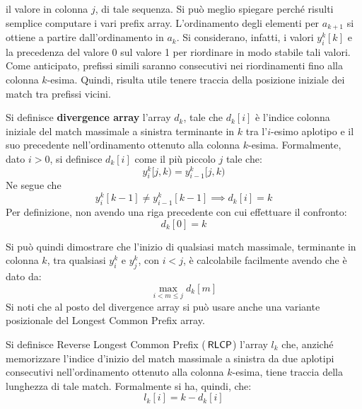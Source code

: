 il valore in colonna $j$, di tale
sequenza. Si può meglio spiegare perché risulti 
semplice computare i vari prefix array. L'ordinamento degli elementi per
$a_{k+1}$ si ottiene a partire 
dall'ordinamento in $a_k$. Si considerano, infatti, i valori $y_i^k[k]$ e la
precedenza del valore 0 sul valore 1 per riordinare in modo stabile tali
valori.\\ 
Come anticipato, prefissi simili saranno consecutivi nei riordinamenti fino alla
colonna $k$-esima. Quindi, risulta utile tenere traccia della posizione iniziale
dei match tra prefissi vicini. 
\begin{definizione}
  Si definisce \textbf{divergence array} l'array $d_k$, tale che $d_k[i]$ è
  l'indice colonna iniziale del match massimale a sinistra terminante in $k$ tra
  l'$i$-esimo aplotipo e il suo precedente nell'ordinamento ottenuto alla
  colonna $k$-esima. Formalmente, dato $i>0$, si definisce 
  $d_k[i]$ come il più piccolo $j$ tale che:
  \begin{equation}
    \label{eq:pbwtdiv}
    y_i^k[j,k)=y_{i-1}^k[j,k)
  \end{equation}
  Ne segue che
  \begin{equation}
    \label{eq:pbwtdiv2}
    y_i^k[k-1]\neq y_{i-1}^k[k-1] \implies d_k[i]=k
  \end{equation}
  Per definizione, non avendo una riga precedente con cui effettuare il
  confronto: 
  \begin{equation}
    \label{eq:pbwtdiv3}
   d_k[0]=k
  \end{equation}
\end{definizione}
Si può quindi dimostrare che l'inizio di qualsiasi match massimale, terminante
in colonna $k$, tra qualsiasi $y_i^k$ e $y_j^k$, con $i<j$, è calcolabile
facilmente avendo che è dato da:
\begin{equation}
  \label{eq:pbwtint}
  \max_{i<m\leq j}d_k[m]
\end{equation}
Si noti che al posto del divergence array si può usare anche una
variante posizionale del Longest Common Prefix array.
\begin{definizione}
  Si definisce Reverse Longest Common Prefix ($\,\mbox{\rm {\sf RLCP}}$) l'array $l_k$
  che, anziché 
  memorizzare l'indice d'inizio del match massimale a sinistra da due aplotipi
  consecutivi nell'ordinamento ottenuto alla colonna $k$-esima, tiene traccia
  della lunghezza di tale match. Formalmente si ha, quindi, che:
  \begin{equation}
    \label{eq:pbwtlcp}
    l_k[i]=k-d_k[i]
  \end{equation}
\end{definizione}
